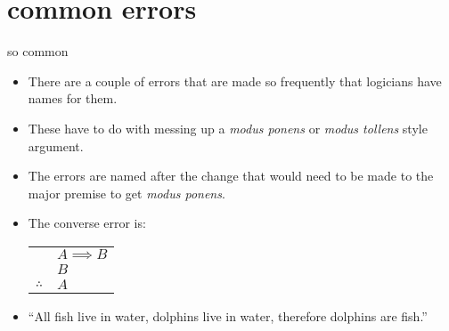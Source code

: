 \documentclass[landscape]{beamer}
\begin{document}
\section{common errors}

\begin{frame}{so common}
\begin{itemize}
\item There are a couple of errors that are made so frequently that logicians have names for them. \pause
\item These have to do with messing up a {\em modus ponens} or {\em modus tollens} style argument. \pause
\item The errors are named after the change that would need to be made to the major premise to get {\em modus ponens}. \pause
\item The converse error is:

\begin{center}
\begin{tabular}{cl}
 & $A \implies B$ \\
 & $B$ \\ \hline
$\therefore$ & $A$\\
\end{tabular}
\end{center}

\pause

\item ``All fish live in water, dolphins live in water, therefore dolphins are fish.''
\end{itemize}
\end{frame}
\end{document}

